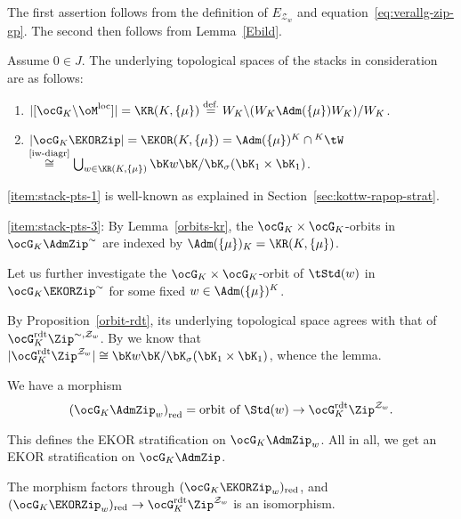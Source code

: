 \documentclass[a4paper]{scrartcl} %
\numberwithin{equation}{section}
\begin{document}
\begin{Proof}
  The first assertion follows from the definition of $E_{\mathcal{Z}_w}$ and equation~\eqref{eq:verallg-zip-gp}. The second then follows from Lemma~\ref{Ebild}.
\end{Proof}


\begin{Lemma}Assume $0\in J$.  
  The underlying topological spaces of the stacks in consideration are as follows:
  \begin{enumerate}[(1)]
  \item\label{item:stack-pts-1} $|[\ocG_K\backslash \oM^\mathrm{loc}]| = \KR(K,\{\mu\}) \overset{\text{def.}}= W_K\backslash (W_K \Adm(\{\mu\})W_K)/W_K$.
  \item\label{item:stack-pts-3} $|\ocG_K\EKORZip| = \EKOR(K,\{\mu\}) = \Adm(\{\mu\})^K\cap{}^K\tW$ \\
    $\overset{\text{\ref{iw-diagr}}}\cong \bigcup_{w\in \KR(K,\{\mu\})} \bK w \bK / \bK_\sigma(\bK_1\times \bK_1)$.
  \end{enumerate}
\end{Lemma}

\begin{Proof}
  \eqref{item:stack-pts-1} is well-known as explained in Section~\ref{sec:kottw-rapop-strat}.

  \eqref{item:stack-pts-3}: By Lemma~\ref{orbits-kr}, the $\ocG_K\times\ocG_K$-orbits in $\ocG_K\AdmZip^{\sim}$ are indexed by $\Adm(\{\mu\})_K=\KR(K,\{\mu\})$.

  Let us further investigate the $\ocG_K\times\ocG_K$-orbit of $\tStd(w)$ in $\ocG_K\EKORZip^{\sim}$ for some fixed $w\in\Adm(\{\mu\})^K$.


  By Proposition~\ref{orbit-rdt}, its underlying topological space agrees with that of $\ocG_K^\mathrm{rdt}\Zip^{\sim,\mathcal{Z}_w}$. By \cite{SYZnew} we know that $|\ocG_K^\mathrm{rdt}\Zip^{\mathcal{Z}_w}|\cong \bK w \bK / \bK_\sigma(\bK_1\times \bK_1)$, whence the lemma.
\end{Proof}




\begin{Corollary}
  We have a morphism
  \begin{equation*}
    \left(\ocG_K\AdmZip_w\right)_\mathrm{red}=\text{orbit of } \Std(w) \to \ocG_K^\mathrm{rdt}\Zip^{\mathcal{Z}_w}.
  \end{equation*}


  This defines the EKOR stratification on $\ocG_K\AdmZip_w$.  All in all, we get an EKOR stratification on $\ocG_K\AdmZip$.

  The morphism factors through $(\ocG_K\EKORZip_w)_\mathrm{red}$, and $(\ocG_K\EKORZip_w)_\mathrm{red}\to \ocG_K^\mathrm{rdt}\Zip^{\mathcal{Z}_w}$ is an isomorphism.
\end{Corollary}
\end{document}
